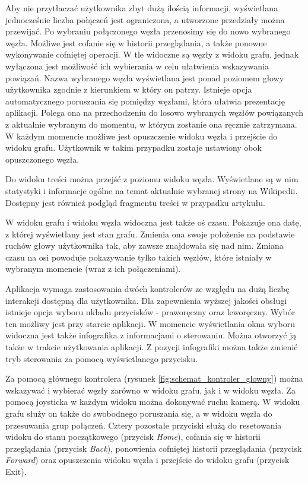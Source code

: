Aby nie przytłaczać użytkownika zbyt dużą ilością informacji, wyświetlana jednocześnie liczba połączeń jest ograniczona, a utworzone przedziały można przewijać. Po wybraniu połączonego węzła przenosimy się do nowo wybranego węzła. Możliwe jest cofanie się w historii przeglądania, a także ponowne wykonywanie cofniętej operacji. W tle widoczne są węzły z widoku grafu, jednak wyłączona jest możliwość ich wybierania w celu ułatwienia wskazywania powiązań. Nazwa wybranego węzła wyświetlana jest ponad poziomem głowy użytkownika zgodnie z kierunkiem w który on patrzy. Istnieje opcja automatycznego poruszania się pomiędzy węzłami, która ułatwia prezentację aplikacji. Polega ona na przechodzeniu do losowo wybranych węzłów powiązanych z aktualnie wybranym do momentu, w którym zostanie ona ręcznie zatrzymana. W każdym momencie możliwe jest opuszczenie widoku węzła i przejście do widoku grafu. Użytkownik w takim przypadku zostaje ustawiony obok opuszczonego węzła. 

Do widoku treści można przejść z poziomu widoku węzła. Wyświetlane są w nim statystyki i informacje ogólne na temat aktualnie wybranej strony na Wikipedii. Dostępny jest również podgląd fragmentu treści w przypadku artykułu.

W widoku grafu i widoku węzła widoczna jest także oś czasu. Pokazuje ona datę, z której wyświetlany jest stan grafu. Zmienia ona swoje położenie na podstawie ruchów głowy użytkownika tak, aby zawsze znajdowała się nad nim. Zmiana czasu na osi powoduje pokazywanie tylko takich węzłów, które istniały w wybranym momencie (wraz z ich połączeniami).

Aplikacja wymaga zastosowania dwóch kontrolerów ze względu na dużą liczbę interakcji dostępną dla użytkownika. Dla zapewnienia wyższej jakości obsługi istnieje opcja wyboru układu przycisków - praworęczny oraz leworęczny. Wybór ten możliwy jest przy starcie aplikacji. W momencie wyświetlania okna wyboru widoczna jest także infografika z informacjami o sterowaniu. Można otworzyć ją także w trakcie użytkowania aplikacji. Z pozycji infografiki można także zmienić tryb sterowania za pomocą wyświetlanego przycisku.

Za pomocą głównego kontrolera (rysunek \ref{fig:schemat_kontroler_glowny}) można wskazywać i wybierać węzły zarówno w widoku grafu, jak i w widoku węzła. Za pomocą joysticka w każdym widoku można dokonywać ruchu kamerą. W widoku grafu służy on także do swobodnego poruszania się, a w widoku węzła do przesuwania grup połączeń. Cztery pozostałe przyciski służą do resetowania widoku do stanu początkowego (przycisk \textit{Home}), cofania się w historii przeglądania (przycisk \textit{Back}), ponowienia cofniętej historii przeglądania (przycisk \textit{Forward}) oraz opuszczenia widoku węzła i przejście do widoku grafu (przycisk Exit).

